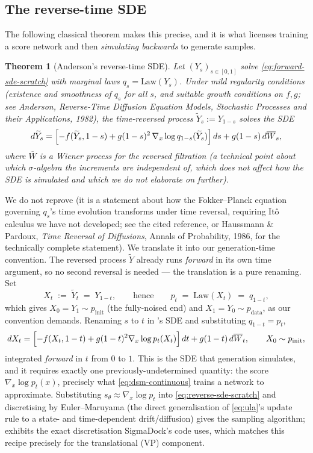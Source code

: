 \documentclass[11pt,a4paper]{report}
\newtheorem{theorem}{Theorem}[chapter]
\theoremstyle{definition}
\theoremstyle{remark}
\begin{document}
\subsection{The reverse-time SDE}

The following classical theorem makes this precise, and it is what
licenses training a score network and then \emph{simulating backwards} to
generate samples.

\begin{theorem}[Anderson's reverse-time SDE]
\label{thm:anderson}
Let $(Y_s)_{s\in[0,1]}$ solve \eqref{eq:forward-sde-scratch} with marginal
laws $q_s=\mathrm{Law}(Y_s)$. Under mild regularity conditions (existence
and smoothness of $q_s$ for all $s$, and suitable growth conditions on
$f,g$; see Anderson, \emph{Reverse-Time Diffusion Equation Models},
Stochastic Processes and their Applications, 1982), the time-reversed
process $\widetilde Y_s := Y_{1-s}$ solves the SDE
\[
d\widetilde Y_s
=
\Bigl[-f(\widetilde Y_s,1-s) + g(1-s)^2\,\nabla_x\log q_{1-s}(\widetilde Y_s)\Bigr]\,ds
+
g(1-s)\,d\overline W_s ,
\]
where $\overline W$ is a Wiener process for the reversed filtration (a
technical point about which $\sigma$-algebra the increments are independent
of, which does not affect how the SDE is simulated and which we do not
elaborate on further).
\end{theorem}

We do not reprove  (it is a statement about how the
Fokker--Planck equation governing $q_s$'s time evolution transforms under
time reversal, requiring It\^o calculus we have not developed; see the
cited reference, or Haussmann \& Pardoux, \emph{Time Reversal of Diffusions},
Annals of Probability, 1986, for the technically complete statement). We
translate it into our generation-time convention. The reversed process
$\widetilde Y$ already runs \emph{forward} in its own time argument, so no
second reversal is needed --- the translation is a pure renaming. Set
\[
X_t \;:=\; \widetilde Y_{t} \;=\; Y_{1-t},
\qquad\text{hence}\qquad
p_t \;=\; \mathrm{Law}(X_t) \;=\; q_{1-t} ,
\]
which gives $X_0=Y_1\sim p_{\mathrm{init}}$ (the fully-noised end) and
$X_1=Y_0\sim p_{\mathrm{data}}$, as our convention demands. Renaming $s$ to
$t$ in 's SDE and substituting $q_{1-t}=p_t$,
\begin{equation}
\label{eq:reverse-sde-scratch}
dX_t
=
\Bigl[-f(X_t,1-t) + g(1-t)^2\nabla_x\log p_t(X_t)\Bigr]\,dt
+
g(1-t)\,d\overline W_t,
\qquad
X_0\sim p_{\mathrm{init}} ,
\end{equation}
integrated \emph{forward} in $t$ from $0$ to $1$. This is the SDE that
generation simulates, and it requires exactly one previously-undetermined
quantity: the score $\nabla_x\log p_t(x)$, precisely what
\eqref{eq:dsm-continuous} trains a network to approximate. Substituting
$s_\theta\approx\nabla_x\log p_t$ into \eqref{eq:reverse-sde-scratch} and
discretising by Euler--Maruyama (the direct generalisation of
\eqref{eq:ula}'s update rule to a state- and time-dependent drift/diffusion)
gives the sampling algorithm;  exhibits the exact
discretisation SigmaDock's code uses, which matches this recipe precisely
for the translational (VP) component.
\end{document}
